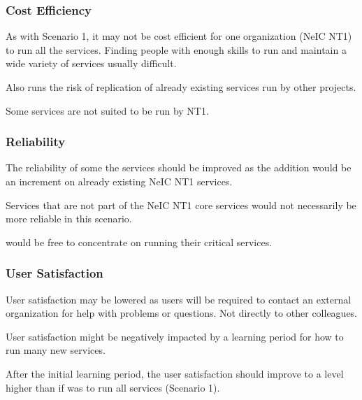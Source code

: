 \documentclass[12pt,a4paper]{article}
\newcommand{\nnt}{NeIC NT1\xspace}
\begin{document}
\subsubsection*{Cost Efficiency}
\bitm
\item As with Scenario 1, it may not be cost efficient for one organization (\nnt) to run all the services. Finding people with enough skills to run and maintain a wide variety of services usually difficult.
\item Also runs the risk of replication of already existing services run by other \einfra projects.
\item Some services are not suited to be run by NT1.
\eitm

\subsubsection*{Reliability}
\bitm
\item The reliability of some the services should be improved as the \ED addition would be an increment on already existing \nnt services.
\item Services that are not part of the \nnt core services would not necessarily be more reliable in this scenario.
\item \EC would be free to concentrate on running their critical services.
\eitm


\subsubsection*{User Satisfaction}
\bitm
\item \ED User satisfaction may be lowered as users will be required to contact an external organization for help with problems or questions. Not directly to other \EC colleagues.
\item User satisfaction might be negatively impacted by a learning period for how to run many new services.
\item After the initial learning period, the user satisfaction should improve to a level higher than if \EC was to run all services (Scenario 1).
\eitm
\end{document}
